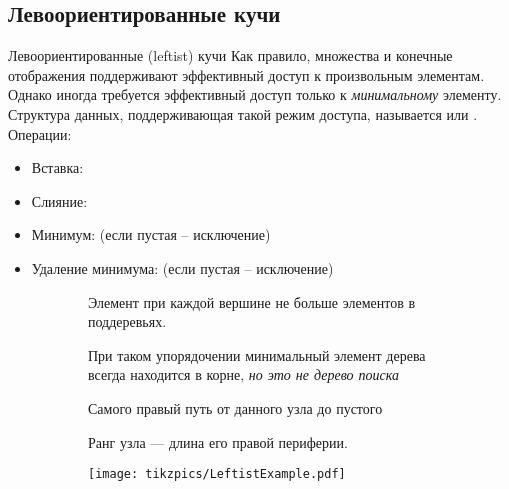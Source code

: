  
\subsection{Левоориентированные кучи}

\begin{frame}{Левоориентированные (leftist) кучи}
Как правило, множества и конечные отображения поддерживают эффективный
доступ к произвольным элементам. \\

Однако иногда требуется эффективный
доступ только к \emph{минимальному} элементу.  Структура данных,
поддерживающая такой режим доступа, называется  или .\\

Операции:
\begin{itemize}
\item Вставка: 
\item Слияние: 
\item Минимум:  (если пустая -- исключение)
\item Удаление минимума:  (если пустая -- исключение)
\end{itemize}
\end{frame}

\begin{frame}{}
\begin{figure}[ht]
\begin{subfigure}{.7\textwidth}
\begin{definition}
Элемент при каждой вершине не больше элементов в поддеревьях.
\end{definition}
При таком упорядочении минимальный элемент дерева всегда находится в корне, \emph{но это не дерево поиска}\\

\begin{definition}
Самого правый путь от данного узла до пустого
\end{definition}
\begin{definition}[Ранг]
Ранг узла --- длина его правой периферии. 
\end{definition}

\end{subfigure}\hspace{1em}
\begin{subfigure}{.25\textwidth}
\texttt{[image: tikzpics/LeftistExample.pdf]}
\end{subfigure}
\end{figure}



\end{frame}

